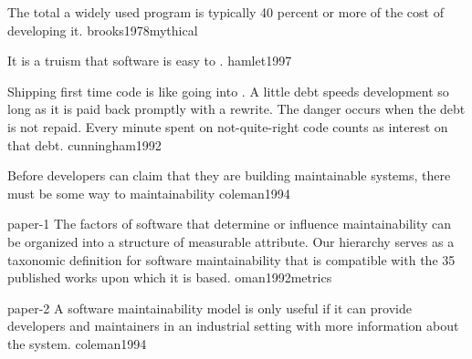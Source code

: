 \documentclass{article}
\begin{document}


  {The total  a widely used program is typically 40 percent or more of the cost of developing it.}
  {brooks1978mythical}

  {It is a truism that  software is easy to .}
  {hamlet1997}

  {Shipping first time code is like going into . A little debt speeds development so long as it is paid back promptly with a rewrite. The danger occurs when the debt is not repaid. Every minute spent on not-quite-right code counts as interest on that debt.}
  {cunningham1992}

  {Before developers can claim that they are building maintainable systems, there must be some way to  maintainability}
  {coleman1994}

\lnQuote
  {paper-1}
  {The factors of software that determine or influence maintainability can be organized into a  structure of measurable attribute. Our hierarchy serves as a taxonomic definition for software maintainability that is compatible with the 35 published works upon which it is based.}
  {oman1992metrics}



\lnQuote
  {paper-2}
  {A software maintainability model is only useful if it can provide developers and maintainers in an industrial setting with more information about the system.}
  {coleman1994}
\end{document}
